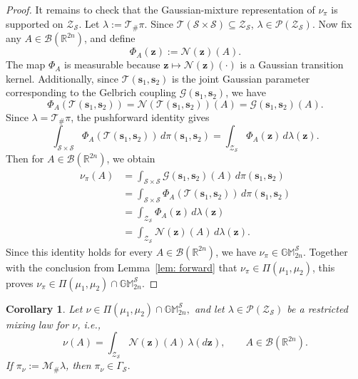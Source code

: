 \documentclass[opre,sglanonrev]{informs4}
\newtheorem{corollary}{Corollary}
\newcommand{\mN}{\mathcal{N}}
\newcommand{\mbR}{\mathbb R}
\newcommand{\mbGM}{\mathbb{GM}}
\newcommand{\bs}{\bm{s}}
\newcommand{\bz}{\bm{z}}
\begin{document}
{\begin{APPENDICES}
\begin{proof}
It remains to check that the Gaussian-mixture representation of \(\nu_\pi\) is
supported on \(\mathcal Z_{\mathcal S}\). Let $\lambda:=\mathcal T_{\#}\pi.$ Since $\mathcal T(\mathcal S\times\mathcal S)\subseteq\mathcal Z_{\mathcal S}$, $\lambda\in\mathcal P(\mathcal Z_{\mathcal S})$. Now fix any \(A\in\mathcal B(\mbR^{2n})\), and define 
\[\Phi_A(\bz):=\mathcal N(\bz)(A).
\]
The map \(\Phi_A\) is measurable because
\(\bz\mapsto\mathcal N(\bz)(\cdot)\) is a Gaussian transition kernel. Additionally, since
\(\mathcal T(\bs_1,\bs_2)\) is the joint Gaussian parameter corresponding to the Gelbrich coupling \(\mathcal G(\bs_1,\bs_2)\), we have
\[
\Phi_A(\mathcal T(\bs_1,\bs_2))
=
\mathcal N(\mathcal T(\bs_1,\bs_2))(A)
=
\mathcal G(\bs_1,\bs_2)(A).
\]
Since \(\lambda=\mathcal T_{\#}\pi\), the pushforward identity gives
\[
\int_{\mathcal S\times\mathcal S}
\Phi_A(\mathcal T(\bs_1,\bs_2))\,d\pi(\bs_1,\bs_2)
=
\int_{\mathcal Z_{\mathcal S}}
\Phi_A(\bz)\,d\lambda(\bz).
\]
Then for $A\in\mathcal B(\mbR^{2n})$, we obtain
\[
\begin{aligned}
\nu_\pi(A)
&=
\int_{\mathcal S\times\mathcal S}
\mathcal G(\bs_1,\bs_2)(A)\,d\pi(\bs_1,\bs_2)\\
&=
\int_{\mathcal S\times\mathcal S}
\Phi_A(\mathcal T(\bs_1,\bs_2))\,d\pi(\bs_1,\bs_2)\\
&=
\int_{\mathcal Z_{\mathcal S}}
\Phi_A(\bz)\,d\lambda(\bz)\\
&=
\int_{\mathcal Z_{\mathcal S}}
\mathcal N(\bz)(A)\,d\lambda(\bz).
\end{aligned}
\]
Since this identity holds for every \(A\in\mathcal B(\mbR^{2n})\), we have $\nu_\pi\in\mbGM_{2n}^{\mathcal S}$. Together with the conclusion from Lemma~\ref{lem: forward} that
\(\nu_\pi\in\Pi(\mu_1,\mu_2)\), this proves $\nu_\pi\in\Pi(\mu_1,\mu_2)\cap\mbGM_{2n}^{\mathcal S}.$
\end{proof}

\begin{corollary}
\label{cor:restricted-backward-containment}
Let $\nu\in\Pi(\mu_1,\mu_2)\cap\mbGM_{2n}^{\mathcal S},$
and let \(\lambda\in\mathcal P(\mathcal Z_{\mathcal S})\) be a restricted
mixing law for \(\nu\), i.e.,
\[
\nu(A)
=
\int_{\mathcal Z_{\mathcal S}}\mN(\bz)(A)\,\lambda(d\bz),
\qquad A\in\mathcal B(\mbR^{2n}).
\]
If $\pi_\nu:=\mathcal M_{\#}\lambda$, then $\pi_\nu\in\Gamma_{\mathcal S}.$
\end{corollary}


\end{APPENDICES}}
\end{document}
